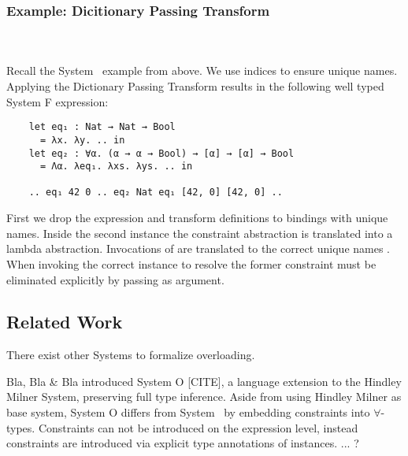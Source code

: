 \subsubsection{Example: Dicitionary Passing Transform}\hfill\\\\
Recall the System \Fo\ example from above. We use indices to ensure unique names.
Applying the Dictionary Passing Transform results in the following well typed System F expression:
\begin{verbatim}
    let eq₁ : Nat → Nat → Bool 
      = λx. λy. .. in
    let eq₂ : ∀α. (α → α → Bool) → [α] → [α] → Bool 
      = Λα. λeq₁. λxs. λys. .. in
    
    .. eq₁ 42 0 .. eq₂ Nat eq₁ [42, 0] [42, 0] .. 
\end{verbatim}
First we drop the \inl{|\Decl|}expression and transform \inl{|\Inst|}definitions to  bindings with unique names. 
Inside the second instance the constraint abstraction is translated into a lambda abstraction. 
Invocations of  are translated to the correct unique names .
When invoking  the correct instance to resolve the former constraint must be eliminated explicitly by passing  as argument.

\subsection{Related Work}
There exist other Systems to formalize overloading. 

Bla, Bla \& Bla introduced System O [CITE], a language extension to the Hindley Milner System, preserving full type inference. 
Aside from using Hindley Milner as base system, System O differs from System \Fo\ by embedding constraints into $\forall$-types. 
Constraints can not be introduced on the expression level, instead constraints are introduced via explicit type annotations of instances. 
... ?
